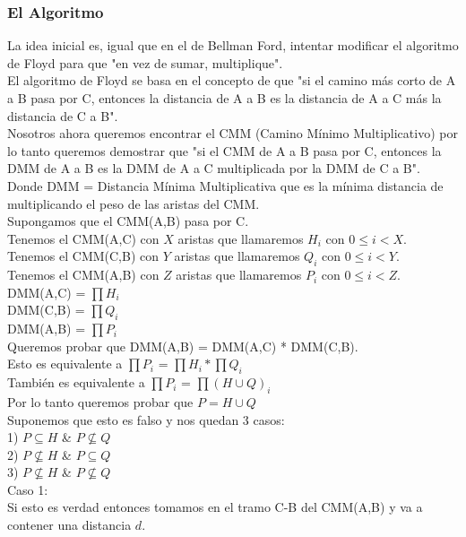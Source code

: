 \documentclass[11pt,a4paper]{article}
\begin{document}
\subsubsection{El Algoritmo}
La idea inicial es, igual que en el de Bellman Ford, intentar modificar el algoritmo de Floyd para que "en vez de sumar, multiplique".\\
El algoritmo de Floyd se basa en el concepto de que "si el camino más corto de A a B pasa por C, entonces la distancia de A a B es la distancia de A a C más la distancia de C a B".\\
Nosotros ahora queremos encontrar el CMM (Camino Mínimo Multiplicativo) por lo tanto queremos demostrar que "si el CMM de A a B pasa por C, entonces la DMM de A a B es la DMM de A a C multiplicada por la DMM de C a B".\\
Donde DMM = Distancia Mínima Multiplicativa que es la mínima distancia de multiplicando el peso de las aristas del CMM.\\
Supongamos que el CMM(A,B) pasa por C.\\
Tenemos el CMM(A,C) con $X$ aristas que llamaremos $H_i$ con $0 \leq i < X$.\\
Tenemos el CMM(C,B) con $Y$ aristas que llamaremos $Q_i$ con $0 \leq i < Y$. \\
Tenemos el CMM(A,B) con $Z$ aristas que llamaremos $P_i$ con $0 \leq i < Z$. \\
DMM(A,C) = $\prod\nolimits H_i$\\
DMM(C,B) = $\prod\nolimits Q_i$\\
DMM(A,B) = $\prod\nolimits P_i$\\
Queremos probar que DMM(A,B) = DMM(A,C) * DMM(C,B).\\
Esto es equivalente a $\prod\nolimits P_i$ = $\prod\nolimits H_i * \prod\nolimits Q_i$\\
También es equivalente a $\prod\nolimits P_i$ = $\prod\nolimits (H \cup Q)_i$\\
Por lo tanto queremos probar que $P = H \cup Q$\\
Suponemos que esto es falso y nos quedan 3 casos:\\
1) $P \subseteq H$ \& $P \nsubseteq Q$\\
2) $P \nsubseteq H$ \& $P \subseteq Q$\\
3) $P \nsubseteq H$ \& $P \nsubseteq Q$\\
Caso 1:\\
Si esto es verdad entonces tomamos en el tramo C-B del CMM(A,B) y va a contener una distancia $d$.\\
\end{document}
